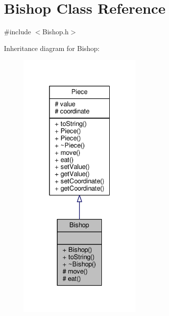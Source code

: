 \hypertarget{class_bishop}{}\section{Bishop Class Reference}
\label{class_bishop}


{\ttfamily \#include $<$Bishop.\+h$>$}



Inheritance diagram for Bishop\+:\nopagebreak
\begin{figure}[H]
\begin{center}
\leavevmode
\includegraphics[width=172pt]{class_bishop__inherit__graph}
\end{center}
\end{figure}


